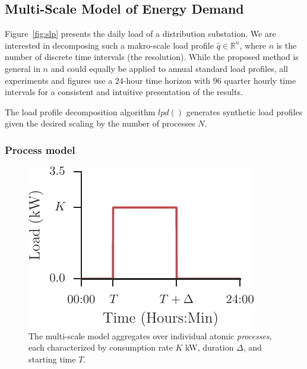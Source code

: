 \documentclass[conference]{IEEEtran}
\begin{document}
\subsection{Multi-Scale Model of Energy Demand}\label{sec:LoadProfilesDecomposition}

Figure~\ref{fig:slp} presents the daily load of a distribution substation. We are interested in decomposing such a makro-scale load profile $\hat{q} \in \mathbb{R}^n$, where $n$ is the number of discrete time intervals (the resolution). While the proposed method is general in $n$ and could equally be applied to annual standard load profiles, all experiments and figures use a $24$-hour time horizon with 96 quarter hourly time intervals for a consistent and intuitive presentation of the results.

The load profile decomposition algorithm $lpd()$ generates synthetic load profiles given the desired scaling by the number of processes $N$. 

\subsubsection{Process model}
\begin{figure}[!b]
\centering
\includegraphics{figures/process.pdf}
\caption{The multi-scale model aggregates over individual atomic \emph{processes}, each characterized by consumption rate $K$ kW, duration $\Delta$, and starting time $T$.}
\label{fig:process}
\end{figure}
\end{document}
